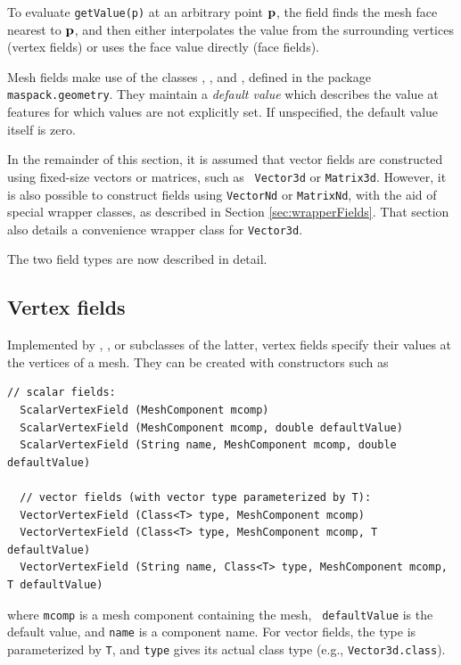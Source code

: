 To evaluate {\tt getValue(p)} at an arbitrary point ${\bf p}$, the field
finds the mesh face nearest to ${\bf p}$, and then either interpolates the
value from the surrounding vertices (vertex fields) or uses the face
value directly (face fields).

Mesh fields make use of the classes
,
, and
, defined in the package
{\tt maspack.geometry}.  They maintain a {\it default value} which
describes the value at features for which values are not explicitly
set. If unspecified, the default value itself is zero.

In the remainder of this section, it is assumed that vector fields are
constructed using fixed-size vectors or matrices, such as {\tt
Vector3d} or {\tt Matrix3d}.  However, it is also possible to
construct fields using {\tt VectorNd} or {\tt MatrixNd}, with the aid
of special wrapper classes, as described in Section
\ref{sec:wrapperFields}. That section also details a convenience
wrapper class for {\tt Vector3d}.

The two field types are now described in detail.

\subsection{Vertex fields}

Implemented by
,
, 
or subclasses of the latter, vertex fields specify their values at the
vertices of a mesh. They can be created with constructors such as
%
\begin{lstlisting}[]
  // scalar fields:
  ScalarVertexField (MeshComponent mcomp)
  ScalarVertexField (MeshComponent mcomp, double defaultValue)
  ScalarVertexField (String name, MeshComponent mcomp, double defaultValue)

  // vector fields (with vector type parameterized by T):
  VectorVertexField (Class<T> type, MeshComponent mcomp)
  VectorVertexField (Class<T> type, MeshComponent mcomp, T defaultValue)
  VectorVertexField (String name, Class<T> type, MeshComponent mcomp, T defaultValue)
\end{lstlisting}
%
where {\tt mcomp} is a mesh component containing the mesh, {\tt
defaultValue} is the default value, and {\tt name} is a component
name. For vector fields, the 
type is parameterized by {\tt T}, and {\tt type} gives its actual
class type (e.g., {\tt Vector3d.class}).

